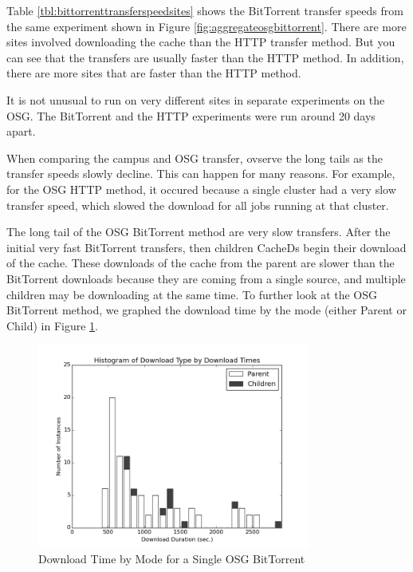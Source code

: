 Table \ref{tbl:bittorrenttransferspeedsites} shows the BitTorrent transfer speeds from the same experiment shown in Figure \ref{fig:aggregateosgbittorrent}.  There are more sites involved downloading the cache than the HTTP transfer method.  But you can see that the transfers are usually faster than the HTTP method.  In addition, there are more sites that are faster than the  HTTP method.

It is not unusual to run on very different sites in separate experiments on the OSG.  The BitTorrent and the HTTP experiments were run around 20 days apart.

When comparing the campus and OSG transfer, ovserve the long tails as the transfer speeds slowly decline.  This can happen for many reasons.  For example, for the OSG HTTP method, it occured because a single cluster had a very slow transfer speed, which slowed the download for all jobs running at that cluster.

The long tail of the OSG BitTorrent method are very slow transfers.  After the initial very fast BitTorrent transfers,  then children CacheDs begin their download of the cache.  These downloads of the cache from the parent are slower than the BitTorrent downloads because they are coming from a single source, and multiple children may be downloading at the same time.  To further look at the OSG BitTorrent method, we graphed the download time by the mode (either Parent or Child) in Figure \ref{fig:dowloadmodebittorrent}.

\begin{figure}[h!t]
\centering
\includegraphics[width=0.8\textwidth]{images/osg-aggregatebittorrentmodes-grayscale.png}
\caption{Download Time by Mode for a Single OSG BitTorrent}
\label{fig:dowloadmodebittorrent}
\end{figure}

